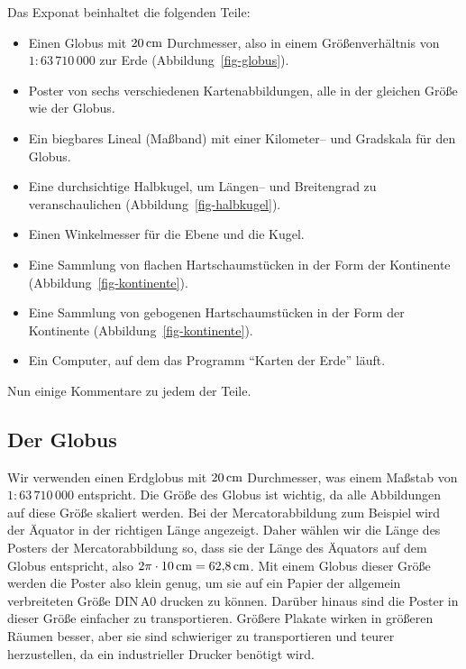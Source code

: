 \documentclass[a4paper,12pt]{article}
\begin{document}
Das Exponat beinhaltet die folgenden Teile:

\begin{itemize}
 \item Einen Globus mit $20\,{\rm cm}$ Durchmesser, also in einem Größenverhältnis
       von $1:63\,710\,000$ zur Erde (Abbildung~\ref{fig-globus}).
 \item Poster von sechs verschiedenen Kartenabbildungen, alle in der gleichen Größe wie 
       der Globus.
 \item Ein biegbares Lineal (Maßband) mit einer Kilometer-- und Gradskala für den Globus.
 \item Eine durchsichtige Halbkugel, um Längen-- und Breitengrad zu veranschaulichen
       (Abbildung~\ref{fig-halbkugel}).
 \item Einen Winkelmesser für die Ebene und die Kugel.
 \item Eine Sammlung von flachen Hartschaumstücken in der Form der Kontinente
       (Abbildung~\ref{fig-kontinente}).
 \item Eine Sammlung von gebogenen Hartschaumstücken in der Form der Kontinente
       (Abbildung~\ref{fig-kontinente}).
 \item Ein Computer, auf dem das Programm "`Karten der Erde"' läuft.
\end{itemize}

\noindent Nun einige Kommentare zu jedem der Teile.


\subsection{Der Globus}

Wir verwenden einen Erdglobus mit $20\,{\rm cm}$ Durchmesser, was einem Maßstab 
von $1:63\,710\,000$ entspricht. Die Größe des Globus ist wichtig, da alle Abbildungen
auf diese Größe skaliert werden. Bei der Mercatorabbildung zum Beispiel wird
der Äquator in der richtigen Länge angezeigt. Daher wählen wir die Länge des Posters
der Mercatorabbildung so, dass sie der Länge des Äquators auf dem Globus entspricht, 
also $2\pi\cdot 10\,{\rm cm} = 62{,}8\,{\rm cm}$. Mit einem Globus dieser Größe werden
die Poster also klein genug, um sie auf ein Papier der allgemein verbreiteten Größe 
DIN\,A0 drucken zu können. Darüber hinaus sind die Poster in dieser Größe einfacher
zu transportieren. Größere Plakate wirken in größeren Räumen besser, aber sie sind
schwieriger zu transportieren und teurer herzustellen, da ein industrieller Drucker
benötigt wird.
\end{document}
